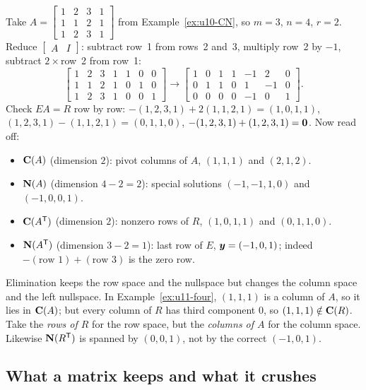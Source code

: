 \begin{example}\label{ex:u11-four}
Take $A=\begin{bmatrix}1&2&3&1\\1&1&2&1\\1&2&3&1\end{bmatrix}$ from Example~\ref{ex:u10-CN},
so $m=3$, $n=4$, $r=2$. Reduce $\begin{bmatrix}A&I\end{bmatrix}$: subtract row~1 from rows~2 and~3,
multiply row~2 by $-1$, subtract $2\times$row~2 from row~1:
\[
\left[\begin{array}{cccc|ccc}1&2&3&1&1&0&0\\1&1&2&1&0&1&0\\1&2&3&1&0&0&1\end{array}\right]
\longrightarrow
\left[\begin{array}{cccc|ccc}1&0&1&1&-1&2&0\\0&1&1&0&1&-1&0\\0&0&0&0&-1&0&1\end{array}\right].
\]
Check $EA=R$ row by row: $-(1,2,3,1)+2(1,1,2,1)=(1,0,1,1)$, $(1,2,3,1)-(1,1,2,1)=(0,1,1,0)$,
$-(1,2,3,1)+(1,2,3,1)=\boldsymbol{0}$. Now read off:
\begin{itemize}
\item $\mathbf{C}(A)$ (dimension $2$): pivot columns of $A$, $(1,1,1)$ and $(2,1,2)$.
\item $\mathbf{N}(A)$ (dimension $4-2=2$): special solutions $(-1,-1,1,0)$ and $(-1,0,0,1)$.
\item $\mathbf{C}(A^{\mathsf{T}})$ (dimension $2$): nonzero rows of $R$, $(1,0,1,1)$ and $(0,1,1,0)$.
\item $\mathbf{N}(A^{\mathsf{T}})$ (dimension $3-2=1$): last row of $E$, $\boldsymbol{y}=(-1,0,1)$; indeed
$-(\text{row }1)+(\text{row }3)$ is the zero row.
\end{itemize}
\end{example}

\begin{trap}
Elimination keeps the row space and the nullspace but changes the column space and the left
nullspace. In Example~\ref{ex:u11-four}, $(1,1,1)$ is a column of $A$, so it lies in $\mathbf{C}(A)$;
but every column of $R$ has third component $0$, so $(1,1,1)\notin\mathbf{C}(R)$. Take the
\emph{rows of $R$} for the row space, but the \emph{columns of $A$} for the column space. Likewise
$\mathbf{N}(R^{\mathsf{T}})$ is spanned by $(0,0,1)$, not by the correct $(-1,0,1)$.
\end{trap}

\subsection{What a matrix keeps and what it crushes}


